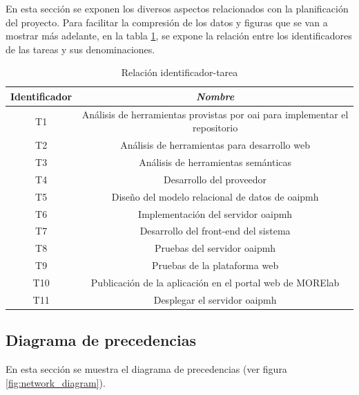 En esta sección se exponen los diversos aspectos relacionados con la planificación del proyecto. Para facilitar la compresión de los datos y figuras que se van a mostrar más adelante, en la tabla \ref{tab:task_id_name}, se expone la relación entre los identificadores de las tareas y sus denominaciones.

\begin{table}[htp]
	\centering
	\caption{Relación identificador-tarea}\label{tab:task_id_name}
	\begin{tabular}{cc}
		\toprule
    	\textbf{Identificador} & \emph{Nombre}\\
    	\midrule
    	T1 & Análisis de herramientas provistas por \acrshort{oai} para implementar el repositorio\\
    	T2 & Análisis de herramientas para desarrollo web\\
    	T3 & Análisis de herramientas semánticas\\
    	T4 & Desarrollo del proveedor\\
    	T5 & Diseño del modelo relacional de datos de \acrshort{oaipmh}\\
    	T6 & Implementación del servidor \acrshort{oaipmh}\\
    	T7 & Desarrollo del front-end del sistema\\
    	T8 & Pruebas del servidor \acrshort{oaipmh}\\
    	T9 & Pruebas de la plataforma web\\
    	T10 & Publicación de la aplicación en el portal web de MORElab\\
    	T11 & Desplegar el servidor \acrshort{oaipmh}\\
    	\bottomrule
    \end{tabular}
\end{table}

\subsection{Diagrama de precedencias}

En esta sección se muestra el diagrama de precedencias (ver figura \ref{fig:network_diagram}).

